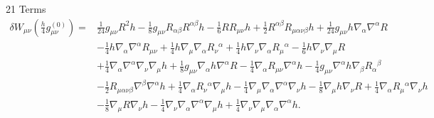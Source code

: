 \documentclass[10pt,letterpaper]{article}
\begin{document}
21 Terms
\begin{align}
\delta W_{\mu\nu}(\tfrac{h}{4}g_{\mu\nu}^{(0)})={}&\tfrac{1}{24} g_{\mu \nu} R^2 h
 -  \tfrac{1}{8} g_{\mu \nu} R_{\alpha \beta} R^{\alpha \beta} h
 -  \tfrac{1}{6} R R_{\mu \nu} h
 + \tfrac{1}{2} R^{\alpha \beta} R_{\mu \alpha \nu \beta} h
 + \tfrac{1}{24} g_{\mu \nu} h \nabla_{\alpha}\nabla^{\alpha}R\nonumber\\
& -  \tfrac{1}{4} h \nabla_{\alpha}\nabla^{\alpha}R_{\mu \nu}
 + \tfrac{1}{4} h \nabla_{\mu}\nabla_{\alpha}R_{\nu}{}^{\alpha}
 + \tfrac{1}{4} h \nabla_{\nu}\nabla_{\alpha}R_{\mu}{}^{\alpha}
 -  \tfrac{1}{6} h \nabla_{\nu}\nabla_{\mu}R\nonumber \\
&+\tfrac{1}{4} \nabla_{\alpha}\nabla^{\alpha}\nabla_{\nu}\nabla_{\mu}h
 + \tfrac{1}{8} g_{\mu \nu} \nabla_{\alpha}h \nabla^{\alpha}R
 -  \tfrac{1}{4} \nabla_{\alpha}R_{\mu \nu} \nabla^{\alpha}h
 -  \tfrac{1}{4} g_{\mu \nu} \nabla^{\alpha}h \nabla_{\beta}R_{\alpha}{}^{\beta}\nonumber\\
& -  \tfrac{1}{2} R_{\mu \alpha \nu \beta} \nabla^{\beta}\nabla^{\alpha}h
 + \tfrac{1}{4} \nabla_{\alpha}R_{\nu}{}^{\alpha} \nabla_{\mu}h
 -  \tfrac{1}{4} \nabla_{\mu}\nabla_{\alpha}\nabla^{\alpha}\nabla_{\nu}h
 -  \tfrac{1}{8} \nabla_{\mu}h \nabla_{\nu}R
 + \tfrac{1}{4} \nabla_{\alpha}R_{\mu}{}^{\alpha} \nabla_{\nu}h\nonumber\\
& -  \tfrac{1}{8} \nabla_{\mu}R \nabla_{\nu}h
 -  \tfrac{1}{4} \nabla_{\nu}\nabla_{\alpha}\nabla^{\alpha}\nabla_{\mu}h
 + \tfrac{1}{4} \nabla_{\nu}\nabla_{\mu}\nabla_{\alpha}\nabla^{\alpha}h.
\end{align}
\end{document}
